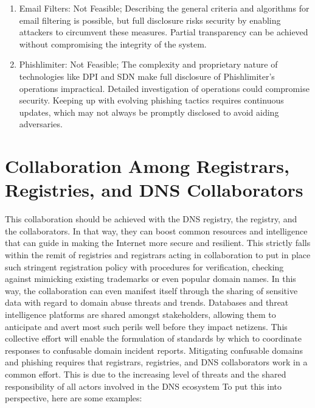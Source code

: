\begin{enumerate}
    \item Email Filters: Not Feasible;  Describing the general criteria and algorithms for email filtering is possible, but full disclosure risks security by enabling attackers to circumvent these measures. Partial transparency can be achieved without compromising the integrity of the system.
    
   
    \item Phishlimiter: Not Feasible; The complexity and proprietary nature of technologies like DPI and SDN make full disclosure of Phishlimiter's operations impractical. Detailed investigation of operations could compromise security. Keeping up with evolving phishing tactics requires continuous updates, which may not always be promptly disclosed to avoid aiding adversaries.
    
\end{enumerate}


\section{Collaboration Among Registrars, Registries, and DNS Collaborators}

This collaboration should be achieved with the DNS registry, the registry, and the collaborators. In that way, they can boost common resources and intelligence that can guide in making the Internet more secure and resilient. This strictly falls within the remit of registries and registrars acting in collaboration to put in place such stringent registration policy with procedures for verification, checking against mimicking existing trademarks or even popular domain names. In this way, the collaboration can even manifest itself through the sharing of sensitive data with regard to domain abuse threats and trends. Databases and threat intelligence platforms are shared amongst stakeholders, allowing them to anticipate and avert most such perils well before they impact netizens. This collective effort will enable the formulation of standards by which to coordinate responses to confusable domain incident reports. Mitigating confusable domains and phishing requires that registrars, registries, and DNS collaborators work in a common effort. This is due to the increasing level of threats and the shared responsibility of all actors involved in the DNS ecosystem \cite{Catania2022} To put this into perspective, here are some examples: 


